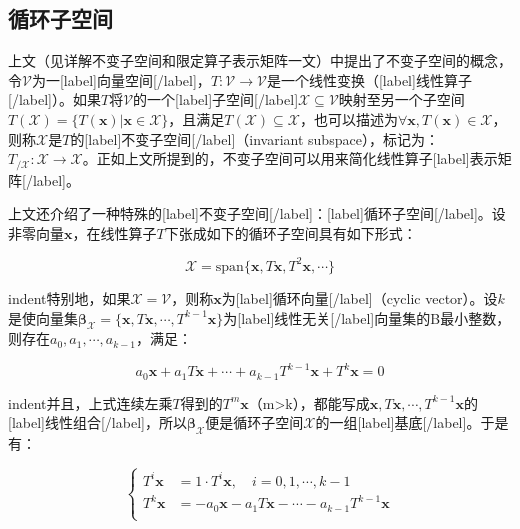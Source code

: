 \documentclass[UTF8,nofonts]{ctexart}
\begin{document}
\subsection*{循环子空间}

上文（见详解不变子空间和限定算子表示矩阵一文）中提出了不变子空间的概念，令$\mathcal{V}$为一[label]向量空间[/label]，$T:\mathcal{V}\to\mathcal{V}$是一个线性变换（[label]线性算子[/label]）。如果$T$将$\mathcal{V}$的一个[label]子空间[/label]$\mathcal{X}\subseteq\mathcal{V}$映射至另一个子空间$T(\mathcal{X})=\{T(\boldsymbol{x})|\boldsymbol{x}\in\mathcal{X}\}$，且满足$T(\mathcal{X})\subseteq\mathcal{X}$，也可以描述为$\forall\boldsymbol{x},T(\boldsymbol{x})\in\mathcal{X}$，则称$\mathcal{X}$是$T$的[label]不变子空间[/label]（invariant subspace），标记为：$T_{/\mathcal{X}}:\mathcal{X}\to\mathcal{X}$。正如上文所提到的，不变子空间可以用来简化线性算子[label]表示矩阵[/label]。

上文还介绍了一种特殊的[label]不变子空间[/label]：[label]循环子空间[/label]。设非零向量$\boldsymbol{x}$，在线性算子$T$下张成如下的循环子空间具有如下形式：

\begin{equation}
\label{eq:cysub}
\mathcal{X}=\text{span}\{\boldsymbol{x},T\boldsymbol{x},T^2\boldsymbol{x},\cdots\}
\end{equation}

indent特别地，如果$\mathcal{X}=\mathcal{V}$，则称$\boldsymbol{x}$为[label]循环向量[/label]（cyclic vector）。设$k$是使向量集$\boldsymbol{\beta}_{\mathcal{X}}=\{\boldsymbol{x},T\boldsymbol{x},\cdots,T^{k-1}\boldsymbol{x}\}$为[label]线性无关[/label]向量集的B最小整数，则存在$a_0,a_1,\cdots,a_{k-1}$，满足：

\begin{equation}
\label{eq:atk}
a_0\boldsymbol{x}+a_1T\boldsymbol{x}+\cdots+a_{k-1}T^{k-1}\boldsymbol{x}+T^k\boldsymbol{x}=0
\end{equation}

indent并且，上式连续左乘$T$得到的$T^m\boldsymbol{x}$（m>k），都能写成$\boldsymbol{x},T\boldsymbol{x},\cdots,T^{k-1}\boldsymbol{x}$的[label]线性组合[/label]，所以$\boldsymbol{\beta}_{\mathcal{X}}$便是循环子空间$\mathcal{X}$的一组[label]基底[/label]。于是有：

\[
\begin{cases}
T^i\boldsymbol{x} &= 1 \cdot T^i\boldsymbol{x},\quad i=0,1,\cdots,k-1\\
T^k\boldsymbol{x} &= -a_0\boldsymbol{x}-a_1T\boldsymbol{x}-\cdots-a_{k-1}T^{k-1}\boldsymbol{x}\\
\end{cases}
\]
\end{document}
